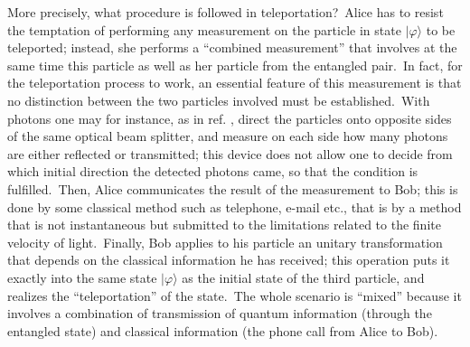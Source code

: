 \documentclass[12pt,onecolumn]{article}%
\begin{document}
More precisely, what procedure is followed in teleportation?\ Alice has to
resist the temptation of performing any measurement on the particle in state
$|\varphi\rangle$ to be teleported; instead, she performs a ``combined
measurement'' that involves at the same time this particle as well as her
particle from the entangled pair.\ In fact, for the teleportation process to
work, an essential feature of this measurement is that no distinction between
the two particles involved must be established.\ With photons one may for
instance, as in ref. \cite{teleport-exp}, direct the particles onto opposite
sides of the same optical beam splitter, and measure on each side how many
photons are either reflected or transmitted; this device does not allow one to
decide from which initial direction the detected photons came, so that the
condition is fulfilled.\ Then, Alice communicates the result of the
measurement to Bob; this is done by some classical method such as telephone,
e-mail etc., that is by a method that is not instantaneous but submitted to
the limitations related to the finite velocity of light.\ Finally, Bob applies
to his particle an unitary transformation that depends on the classical
information he has received; this operation puts it exactly into the same
state $|\varphi\rangle$ as the initial state of the third particle, and realizes
the ``teleportation'' of the state.\ The whole scenario is ``mixed'' because
it involves a combination of transmission of quantum information (through the
entangled state) and classical information (the phone call from Alice to Bob).
\end{document}
